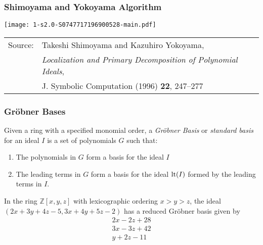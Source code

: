 \documentclass[11pt]{beamer}
\begin{document}
\begin{frame}
\frametitle{Shimoyama and Yokoyama Algorithm}
\texttt{[image: 1-s2.0-S0747717196900528-main.pdf]}

\vfill
\small
\begin{tabular}{ll}
Source: & Takeshi Shimoyama and Kazuhiro Yokoyama, \\
        & {\it Localization and Primary Decomposition of Polynomial Ideals}, \\
        & J. Symbolic Computation (1996) {\bf 22}, 247–277 \\
\end{tabular}
\end{frame}

\begin{frame}
\frametitle{Gr\"obner Bases}
\begin{definition}
Given a ring with a specified monomial order,
a {\it Gr\"obner Basis} or {\it standard basis} for an ideal $I$ is a set of
polynomials $G$ such that:
\begin{enumerate}
\item The polynomials in $G$ form a basis for the ideal $I$
\item The leading terms in $G$ form a basis for the ideal ${\rm lt}(I)$ formed by the leading terms in $I$.
\end{enumerate}
\end{definition}

\begin{example}
In the ring ${\mathbb Z}[x,y,z]$ with lexicographic ordering $x>y>z$, the ideal $(2x+3y+4z-5, 3x+4y+5z-2)$
has a reduced Gr\"obner basis given by
\begin{align*}
2x-2z+28 \\
3x-3z+42 \\
y+2z-11
\end{align*}
\end{example}
\end{frame}
\end{document}

